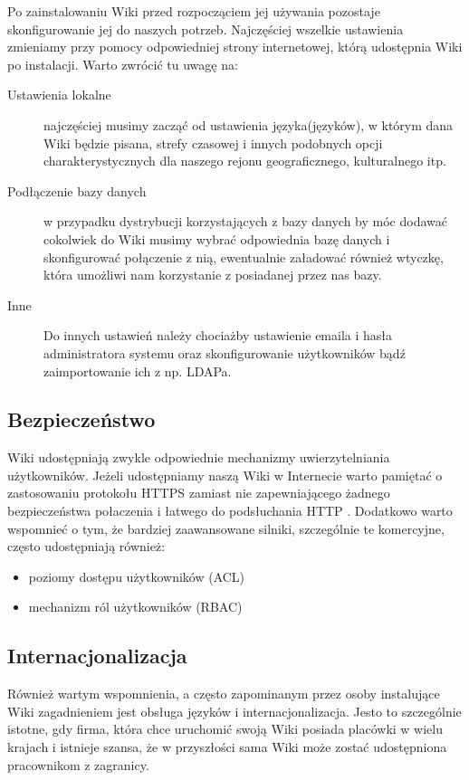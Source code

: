 \documentclass{article}
\begin{document}
		Po zainstalowaniu Wiki przed rozpocząciem jej używania pozostaje skonfigurowanie jej do naszych potrzeb. Najczęściej wszelkie ustawienia zmieniamy przy pomocy odpowiedniej strony internetowej, którą udostępnia Wiki po instalacji. Warto zwrócić tu uwagę na:
		\begin{description}
			\item[Ustawienia lokalne] najczęściej musimy zacząć od ustawienia języka(języków), w którym dana Wiki będzie pisana, strefy czasowej i innych podobnych opcji charakterystycznych dla naszego rejonu geograficznego, kulturalnego itp.
			\item[Podłączenie bazy danych] w przypadku dystrybucji korzystających z bazy danych by móc dodawać cokolwiek do Wiki musimy wybrać odpowiednia bazę danych i skonfigurować połączenie z nią, ewentualnie załadować również wtyczkę, która umożliwi nam korzystanie z posiadanej przez nas bazy.
			\item[Inne] Do innych ustawień należy chociażby ustawienie emaila i hasła administratora systemu oraz skonfigurowanie użytkowników bądź zaimportowanie ich z np. LDAPa.
		\end{description}

	\subsection{Bezpieczeństwo}
		Wiki udostępniają zwykle odpowiednie mechanizmy uwierzytelniania użytkowników. Jeżeli udostępniamy naszą Wiki w Internecie warto pamiętać o zastosowaniu protokołu HTTPS zamiast nie zapewniającego żadnego bezpieczeństwa połaczenia i łatwego do podsłuchania HTTP
.
		Dodatkowo warto wspomnieć o tym, że bardziej zaawansowane silniki, szczególnie te komercyjne, często udostępniają również:
		\begin{itemize}
			\item poziomy dostępu użytkowników (ACL)
			\item mechanizm ról użytkowników (RBAC)
		\end{itemize}
	\subsection{Internacjonalizacja}
		Również wartym wspomnienia, a często zapominanym przez osoby instalujące Wiki zagadnieniem jest obsługa języków i internacjonalizacja. Jesto to szczególnie istotne, gdy firma, która chce uruchomić swoją Wiki posiada placówki w wielu krajach i istnieje szansa, że w przyszłości sama Wiki może zostać udostępniona pracownikom z zagranicy.
\end{document}

